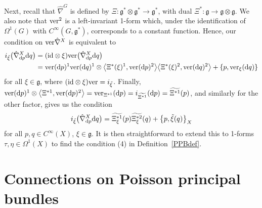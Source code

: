 \documentclass[pdftex]{sigma}
\numberwithin{equation}{section}
\newcommand{\<}{{\langle}}
\renewcommand{\>}{{\rangle}}
\newcommand{\tens}{\otimes}
\newcommand{\id}{{\rm id}}
\newcommand{\extd}{{\rm d}}
\newcommand{\cg}{{\mathfrak{g}}}
\newcommand{\ver}{{\rm ver}}
\begin{document}
\begin{Remark}
Next, recall that $\hat\nabla^G$ is defined by $\Xi\colon \mathfrak{g}^*\tens\mathfrak{g}^*\rightarrow \mathfrak{g}^*$, with dual $\Xi^*\colon \mathfrak{g}\rightarrow\mathfrak{g}\tens\mathfrak{g}$. We also note that $\ver^2$ is a left-invariant 1-form which, under the identification of $\Omega^1(G)$ with $C^\infty(G,\cg^*)$, corresponds to a constant function. Hence, our condition on $\ver \hat\nabla^X$ is equivalent to
\begin{align*}
i_{\tilde\xi}\big(\hat{\nabla}^X_{\extd p}\extd q\big)&= (\id\tens\xi)\ver \big(\hat{\nabla}^X_{\extd p}\extd q\big)\\
&=\ver (\extd p)^1\ver (\extd q)^1\tens\big\langle\Xi^*(\xi)^1,\ver (\extd p)^2\big\rangle
\big\langle\Xi^*(\xi)^2,\ver (\extd q)^2\big\rangle+ \lbrace p,\ver _\xi(\extd q) \rbrace
\end{align*}
for all $\xi\in\cg$, where $(\id\tens\xi)\ver =i_{\tilde\xi}$. Finally, $\ver (\extd p)^1\tens\big\langle\Xi^{*1},\ver (\extd p)^2\big\rangle=\ver _{\Xi^{*1}}(\extd p)=i_{\widetilde{\Xi^{*1}}}(\extd p)=\widetilde{\Xi^{*1}}(p)$, and similarly for the other factor, gives us the condition
\begin{equation*}%
i_{\tilde\xi}\big(\hat{\nabla}^X_{\extd p}\extd q\big)=\widetilde{\Xi^{*1}_\xi}(p)\widetilde{\Xi^{*2}_\xi}(q)+\big\lbrace p,{\tilde\xi}(q)\big\rbrace_X
\end{equation*}
for all $p,q\in C^\infty(X)$, $\xi\in\mathfrak{g}$. It is then straightforward to extend this to 1-forms $\tau,\eta\in\Omega^1(X)$ to find the condition (4) in Definition~\ref{PPBdef}. \end{Remark}

\section{Connections on Poisson principal bundles}\label{Assocsec}
\end{document}
